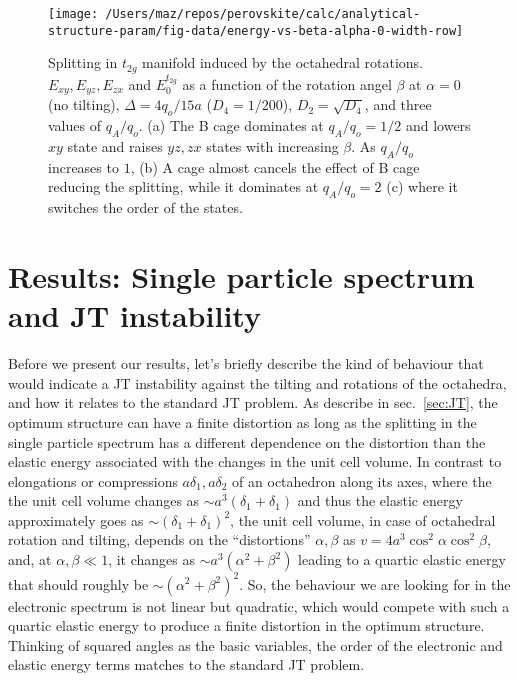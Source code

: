 \documentclass[a4paper,prb,twocolumn]{revtex4-1}  %
\begin{document}
\begin{figure}[htbp]
\begin{center}
\texttt{[image: /Users/maz/repos/perovskite/calc/analytical-structure-param/fig-data/energy-vs-beta-alpha-0-width-row]}
\caption{
Splitting in $t_{2g}$ manifold induced by the
octahedral rotations.
$E_{xy},E_{yz},E_{zx}$ 
and $E_0^{t_{2g}}$
as a function of the rotation angel $\beta$
at $\alpha=0$ (no tilting),
$\Delta=4q_o/15a$ ($D_4=1/200$), $D_2=\sqrt{D_4}$,
and three values of $q_A/q_o$.
(a)
The B cage dominates at $q_A/q_o=1/2$
and lowers $xy$ state and raises $yz,zx$ states
with increasing $\beta$.
As $q_A/q_o$ increases to $1$, 
(b)
A cage almost cancels the effect of B cage reducing the splitting,
while it dominates at $q_A/q_o=2$ (c) where it switches the order of the states. 
}
\label{fig:t2g-alpha0}
\end{center}
\end{figure}



\section{Results: Single particle spectrum and JT instability}
\label{sec:results}
 
 

Before we present our results,
let's briefly describe 
the kind of behaviour that would indicate a JT instability 
against the tilting and rotations of the octahedra,
and how it relates to the standard JT problem.
As describe in sec.~\ref{sec:JT},
the optimum structure can have a finite distortion
as long as 
the splitting in the single particle spectrum has a different dependence on the distortion
than the elastic energy associated with the changes in the unit cell volume.
In contrast to 
elongations or compressions 
$a\delta_1,a\delta_2$ 
of an octahedron along its axes,
where the 
 the unit cell volume changes
as $\sim a^3\left(\delta_1+\delta_1\right)$
and thus the elastic energy approximately goes
as $\sim\left(\delta_1+\delta_1\right)^2$,
the unit cell volume,
in case of octahedral rotation and tilting,
 depends on the ``distortions'' $\alpha,\beta$ 
as ${v=4a^3 \cos ^2\alpha \cos ^2\beta}$,
and, at $\alpha,\beta\ll1$,
it changes as $\sim a^3\left(\alpha ^2+\beta ^2\right)$
leading to a quartic elastic energy that should roughly be
$\sim\left(\alpha ^2+\beta ^2\right)^2$.
So, the behaviour we are looking for in the electronic spectrum 
is not linear
but quadratic, 
which would compete with such a quartic elastic energy
 to produce a finite distortion in the optimum structure.
Thinking of squared angles as the basic variables,
the order of the electronic and elastic energy terms
matches to the standard JT problem.
\end{document}
